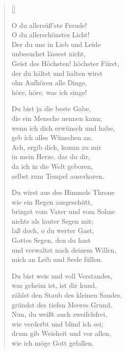 \begin{multicols}{2}
\settowidth{\versewidth}{Du wirst aus des Himmels Throne}
\begin{verse}[\versewidth]

 O du allersüß'ste Freude!\\
O du allerschönstes Licht!\\
Der du uns in Lieb und Leide\\
unbesuchet lässest nicht,\\
Geist des Höchsten! höchster Fürst,\\
der du hältst und halten wirst\\
ohn Aufhören alle Dinge,\\
höre, höre, was ich singe!

 Du bist ja die beste Gabe,\\
die ein Mensche nennen kann;\\
wenn ich dich erwünsch und habe,\\
geb ich alles Wünschen an.\\
Ach, ergib dich, komm zu mir\\
in mein Herze, das du dir,\\
da ich in die Welt geboren,\\
selbst zum Tempel auserkoren.

 Du wirst aus des Himmels Throne\\
wie ein Regen ausgeschütt,\\
bringst vom Vater und vom Sohne\\
nichts als lauter Segen mit;\\
laß doch, o du werter Gast,\\
Gottes Segen, den du hast\\
und verwaltst nach deinem Willen,\\
mich an Leib und Seele füllen.

 Du bist weis und voll Verstandes,\\
was geheim ist, ist dir kund,\\
zählst den Staub des kleinen Sandes,\\
gründst des tiefen Meeres Grund.\\
Nun, du weißt auch zweifelsfrei,\\
wie verderbt und blind ich sei;\\
drum gib Weisheit und vor allen,\\
wie ich möge Gott gefallen.


\end{verse}
\end{multicols}
